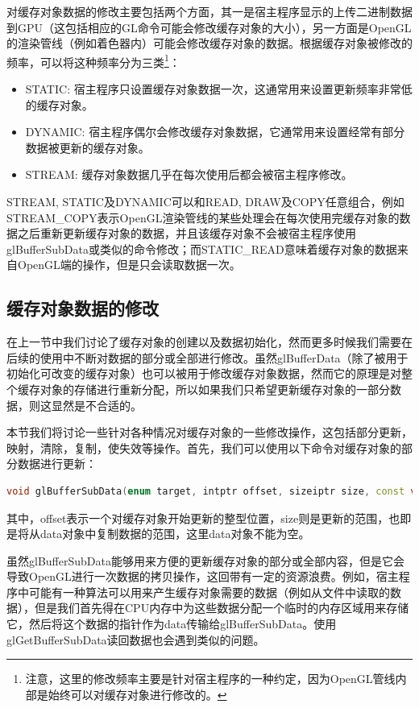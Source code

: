 对缓存对象数据的修改主要包括两个方面，其一是宿主程序显示的上传二进制数据到GPU（这包括相应的GL命令可能会修改缓存对象的大小），另一方面是OpenGL的渲染管线（例如着色器内）可能会修改缓存对象的数据。根据缓存对象被修改的频率，可以将这种频率分为三类\footnote{注意，这里的修改频率主要是针对宿主程序的一种约定，因为OpenGL管线内部是始终可以对缓存对象进行修改的。}：

\begin{itemize}
	\item STATIC: 宿主程序只设置缓存对象数据一次，这通常用来设置更新频率非常低的缓存对象。
	\item DYNAMIC: 宿主程序偶尔会修改缓存对象数据，它通常用来设置经常有部分数据被更新的缓存对象。
	\item STREAM: 缓存对象数据几乎在每次使用后都会被宿主程序修改。
\end{itemize}

STREAM, STATIC及DYNAMIC可以和READ, DRAW及COPY任意组合，例如STREAM\_COPY表示OpenGL渲染管线的某些处理会在每次使用完缓存对象的数据之后重新更新缓存对象的数据，并且该缓存对象不会被宿主程序使用glBufferSubData​或类似的命令修改；而STATIC\_READ意味着缓存对象的数据来自OpenGL端的操作，但是只会读取数据一次。 




\subsection{缓存对象数据的修改}
在上一节中我们讨论了缓存对象的创建以及数据初始化，然而更多时候我们需要在后续的使用中不断对数据的部分或全部进行修改。虽然glBufferData（除了被用于初始化可改变的缓存对象）也可以被用于修改缓存对象数据，然而它的原理是对整个缓存对象的存储进行重新分配，所以如果我们只希望更新缓存对象的一部分数据，则这显然是不合适的。

本节我们将讨论一些针对各种情况对缓存对象的一些修改操作，这包括部分更新，映射，清除，复制，使失效等操作。首先，我们可以使用以下命令对缓存对象的部分数据进行更新：

\begin{lstlisting}[language=C++]
void glBufferSubData​(enum target, intptr offset, sizeiptr size, const void *data)
\end{lstlisting}

其中，offset表示一个对缓存对象开始更新的整型位置，size则是更新的范围，也即是将从data对象中复制数据的范围，这里data对象不能为空。

虽然glBufferSubData能够用来方便的更新缓存对象的部分或全部内容，但是它会导致OpenGL进行一次数据的拷贝操作，这回带有一定的资源浪费。例如，宿主程序中可能有一种算法可以用来产生缓存对象需要的数据（例如从文件中读取的数据），但是我们首先得在CPU内存中为这些数据分配一个临时的内存区域用来存储它，然后将这个数据的指针作为data传输给glBufferSubData。使用glGetBufferSubData读回数据也会遇到类似的问题。

